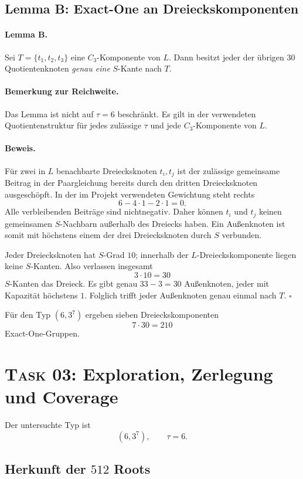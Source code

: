\documentclass[11pt,a4paper]{article}
\newcommand{\taskthree}{\textsc{Task 03}}
\begin{document}
\subsection{Lemma B: Exact-One an Dreieckskomponenten}

\paragraph{Lemma B.}
Sei $T=\{t_1,t_2,t_3\}$ eine $C_3$-Komponente von $L$. Dann besitzt jeder der übrigen $30$ Quotientenknoten \emph{genau eine} $S$-Kante nach $T$.

\paragraph{Bemerkung zur Reichweite.}
Das Lemma ist nicht auf $\tau=6$ beschränkt. Es gilt in der verwendeten Quotientenstruktur für jedes zulässige $\tau$ und jede $C_3$-Komponente von $L$.

\paragraph{Beweis.}
Für zwei in $L$ benachbarte Dreiecksknoten $t_i,t_j$ ist der zulässige gemeinsame Beitrag in der Paargleichung bereits durch den dritten Dreiecksknoten ausgeschöpft. In der im Projekt verwendeten Gewichtung steht rechts
\[
6-4\cdot1-2\cdot1=0.
\]
Alle verbleibenden Beiträge sind nichtnegativ. Daher können $t_i$ und $t_j$ keinen gemeinsamen $S$-Nachbarn außerhalb des Dreiecks haben. Ein Außenknoten ist somit mit höchstens einem der drei Dreiecksknoten durch $S$ verbunden.

Jeder Dreiecksknoten hat $S$-Grad $10$; innerhalb der $L$-Dreieckskomponente liegen keine $S$-Kanten. Also verlassen insgesamt
\[
3\cdot10=30
\]
$S$-Kanten das Dreieck. Es gibt genau $33-3=30$ Außenknoten, jeder mit Kapazität höchstens $1$. Folglich trifft jeder Außenknoten genau einmal nach $T$.
\hfill$\square$

Für den Typ $(6,3^7)$ ergeben sieben Dreieckskomponenten
\[
7\cdot30=210
\]
Exact-One-Gruppen.

\section{\taskthree: Exploration, Zerlegung und Coverage}

Der untersuchte Typ ist
\[
(6,3^7),\qquad \tau=6.
\]

\subsection{Herkunft der $512$ Roots}
\end{document}
